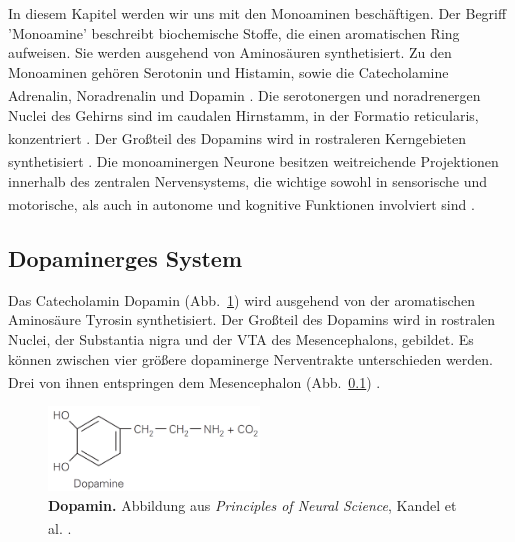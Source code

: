 \documentclass[12pt,a4paper,pdftex]{article}
\begin{document}
In diesem Kapitel werden wir uns mit den Monoaminen beschäftigen.
Der Begriff 'Monoamine'  beschreibt biochemische Stoffe, die einen aromatischen Ring aufweisen. Sie werden ausgehend von Aminosäuren synthetisiert. Zu den Monoaminen gehören Serotonin und Histamin, sowie die Catecholamine Adrenalin, Noradrenalin und Dopamin \textsuperscript{\cite[46]{kandel2013principles}}. Die serotonergen und noradrenergen Nuclei des Gehirns sind im caudalen Hirnstamm, in der Formatio reticularis, konzentriert \textsuperscript{\cite[7]{trepel2011neuroanatomie}}.
Der Großteil des Dopamins wird in rostraleren Kerngebieten synthetisiert \textsuperscript{\cite[63]{kandel2013principles}}.
Die monoaminergen Neurone besitzen weitreichende Projektionen innerhalb des zentralen Nervensystems, die wichtige sowohl in sensorische und motorische, als auch in autonome und kognitive Funktionen involviert sind \textsuperscript{\cite[9]{crossman2014neuroanatomy}}.


\subsection{Dopaminerges System}
\label{dopaminerges_system}
Das Catecholamin Dopamin (Abb.~\ref{fig:dopamin}) wird ausgehend von der aromatischen Aminosäure Tyrosin synthetisiert. Der Großteil des Dopamins wird in rostralen Nuclei, der Substantia nigra  und der VTA des Mesencephalons, gebildet. Es können zwischen vier größere dopaminerge Nerventrakte unterschieden werden. Drei von ihnen entspringen dem Mesencephalon (Abb.~\ref{dopaminerges_system}) \textsuperscript{\cite[13]{kandel2013principles}}. 


\begin{figure}[H]
    \centering
    \includegraphics[width=0.5\textwidth]{pictures/Bilder_monoamine_systeme/dopamin.PNG}
    \caption[Dopamin]{\textbf{Dopamin.} Abbildung aus \textit{Principles of Neural Science}, Kandel et al. \textsuperscript{\cite[13]{kandel2013principles}}.}
    \label{fig:dopamin}
\end{figure}{}
\end{document}
